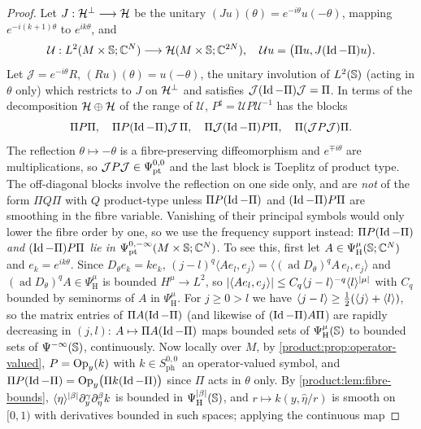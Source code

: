 \begin{proof} Let $J:\mathcal{H}^\perp\longrightarrow\mathcal{H}$ be the unitary
$(Ju)(\theta)=e^{-i\theta}u(-\theta)$, mapping $e^{-i(k+1)\theta}$ to $e^{ik\theta}$, and
\[
\mathcal U:L^2(M\times\mathbb{S};\mathbb{C}^N)\longrightarrow\mathcal{H}(M\times\mathbb{S};\mathbb{C}^{2N}),\quad
\mathcal Uu=\bigl(\Pi u,J(\operatorname{Id}-\Pi)u\bigr).
\]
Let $\mathcal J=e^{-i\theta}R$, $(Ru)(\theta)=u(-\theta)$, the unitary involution of
$L^2(\mathbb{S})$ (acting in $\theta$ only) which restricts to $J$ on $\mathcal{H}^\perp$ and
satisfies $\mathcal J(\operatorname{Id}-\Pi)\mathcal J=\Pi$. In terms of the decomposition
$\mathcal{H}\oplus\mathcal{H}$ of the range of $\mathcal U$, $P^\sharp=\mathcal UP\mathcal U^{-1}$ has the
blocks
\[
\Pi P\Pi,\quad \Pi P(\operatorname{Id}-\Pi)\mathcal J\,\Pi,\quad \Pi\mathcal J(\operatorname{Id}-\Pi)P\Pi,\quad
\Pi(\mathcal JP\mathcal J)\Pi .
\]
The reflection $\theta\mapsto-\theta$ is a fibre-preserving diffeomorphism and
$e^{\mp i\theta}$ are multiplications, so $\mathcal JP\mathcal J\in\Psi^{0,0}_{\mathrm{pt}}$ and the
last block is Toeplitz of product type. The off-diagonal blocks involve the
reflection on one side only, and are \emph{not} of the form $\Pi Q\Pi$ with $Q$
product-type unless $\Pi P(\operatorname{Id}-\Pi)$ and $(\operatorname{Id}-\Pi)P\Pi$ are smoothing in the fibre
variable. Vanishing of their principal symbols would only lower the fibre order by
one, so we use the frequency support instead: \emph{$\Pi P(\operatorname{Id}-\Pi)$ and
$(\operatorname{Id}-\Pi)P\Pi$ lie in $\Psi^{0,-\infty}_{\mathrm{pt}}(M\times\mathbb{S};\mathbb{C}^N)$}. To see this, first
let $A\in\Psi^\mu_{\mathrm H}(\mathbb{S};\mathbb{C}^N)$ and $e_k=e^{ik\theta}$. Since $D_\theta e_k=ke_k$,
$(j-l)^q\langle Ae_l,e_j\rangle=\langle(\operatorname{ad}D_\theta)^qA\,e_l,e_j\rangle$ and
$(\operatorname{ad}D_\theta)^qA\in\Psi^\mu_{\mathrm H}$ is bounded $H^\mu\to L^2$, so
$\lvert \langle Ae_l,e_j\rangle\rvert\le C_q\langle j-l\rangle^{-q}\langle l\rangle^{\lvert \mu\rvert}$ with $C_q$ bounded
by seminorms of $A$ in $\Psi^\mu_{\mathrm H}$. For $j\ge0>l$ we have
$\langle j-l\rangle\ge\frac12(\langle j\rangle+\langle l\rangle)$, so the matrix entries of $\Pi A(\operatorname{Id}-\Pi)$ (and
likewise of $(\operatorname{Id}-\Pi)A\Pi$) are rapidly decreasing in $(j,l)$: $A\mapsto\Pi A(\operatorname{Id}-\Pi)$
maps bounded sets of $\Psi^\mu_{\mathrm H}(\mathbb{S})$ to bounded sets of $\Psi^{-\infty}(\mathbb{S})$,
continuously. Now locally over $M$, by \cref{product:prop:operator-valued},
$P=\operatorname{Op}_y(k)$ with $k\in S^{0,0}_{\mathrm{ph}}$ an operator-valued symbol, and
$\Pi P(\operatorname{Id}-\Pi)=\operatorname{Op}_y\bigl(\Pi k(\operatorname{Id}-\Pi)\bigr)$ since $\Pi$ acts in $\theta$ only. By
\cref{product:lem:fibre-bounds}, $\langle \eta\rangle^{\lvert \beta\rvert}\partial_y^\gamma\partial_\eta^\beta k$ is
bounded in $\Psi^{|\beta|}_{\mathrm H}(\mathbb{S})$, and $r\mapsto k(y,\hat\eta/r)$ is smooth on
$[0,1)$ with derivatives bounded in such spaces; applying the continuous map

\end{proof}
